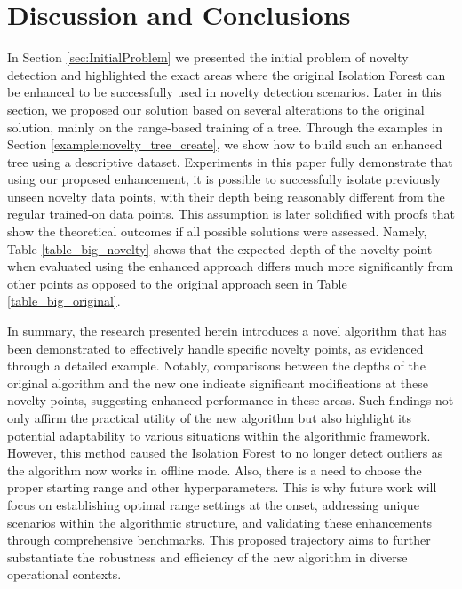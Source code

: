 \section{Discussion and Conclusions}
\label{sec:conclusion}






In Section \ref{sec:InitialProblem} we presented the initial problem of novelty detection and highlighted the exact areas where the original Isolation Forest can be enhanced to be successfully used in novelty detection scenarios.
Later in this section, we proposed our solution based on several alterations to the original solution, mainly on the range-based training of a tree.
Through the examples in Section \ref{example:novelty_tree_create}, we show how to build such an enhanced tree using a descriptive dataset.
Experiments in this paper fully demonstrate that using our proposed enhancement, it is possible to successfully isolate previously unseen novelty data points, with their depth being reasonably different from the regular trained-on data points.
This assumption is later solidified with proofs that show the theoretical outcomes if all possible solutions were assessed. Namely, Table \ref{table_big_novelty} shows that the expected depth of the novelty point when evaluated using the enhanced approach differs much more significantly from other points as opposed to the original approach seen in Table \ref{table_big_original}.

In summary, the research presented herein introduces a novel algorithm that has been demonstrated to effectively handle specific novelty points, as evidenced through a detailed example. Notably, comparisons between the depths of the original algorithm and the new one indicate significant modifications at these novelty points, suggesting enhanced performance in these areas. Such findings not only affirm the practical utility of the new algorithm but also highlight its potential adaptability to various situations within the algorithmic framework. However, this method caused the Isolation Forest to no longer detect outliers as the algorithm now works in offline mode. Also, there is a need to choose the proper starting range and other hyperparameters. This is why future work will focus on establishing optimal range settings at the onset, addressing unique scenarios within the algorithmic structure, and validating these enhancements through comprehensive benchmarks. This proposed trajectory aims to further substantiate the robustness and efficiency of the new algorithm in diverse operational contexts.
